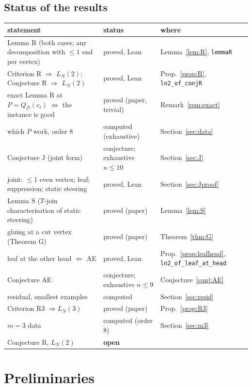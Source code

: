 \documentclass[11pt]{amsart}
\theoremstyle{definition}
\newcommand{\cD}{\mathcal D}
\begin{document}
\subsection*{Status of the results}
\begin{center}\footnotesize
\begin{tabular}{@{}p{}p{}p{}@{}}
\toprule
statement & status & where\\
\midrule
Lemma R (both cases; any decomposition with $\le1$ end per vertex) & proved, Lean & Lemma~\ref{lem:R}, \texttt{lemmaR}\\
Criterion R $\Rightarrow$ $L_N(2)$; Conjecture R $\Rightarrow$ $L_N(2)$ & proved, Lean & Prop.~\ref{prop:R}, \texttt{ln2\_of\_conjR}\\
exact Lemma R at $P=Q_\cD(c_i)$ $\Leftrightarrow$ the instance is good & proved (paper, trivial) & Remark~\ref{rem:exact}\\
which $P$ work, order $8$ & computed (exhaustive) & Section~\ref{sec:data}\\
Conjecture J (joint form) & conjecture; exhaustive $n\le10$ & Section~\ref{sec:J}\\
joint: $\le1$ even vertex; leaf; suppression; static steering & proved, Lean & Section~\ref{sec:Jproof}\\
Lemma S ($T$-join characterisation of static steering) & proved (paper) & Lemma~\ref{lem:S}\\
gluing at a cut vertex (Theorem G) & proved (paper) & Theorem~\ref{thm:G}\\
leaf at the other head $\Leftarrow$ AE & proved, Lean & Prop.~\ref{prop:leafhead}, \texttt{ln2\_of\_leaf\_at\_head}\\
Conjecture AE & conjecture; exhaustive $n\le9$ & Conjecture~\ref{conj:AE}\\
residual, smallest examples & computed & Section~\ref{sec:resid}\\
Criterion R3 $\Rightarrow L_N(3)$ & proved (paper) & Prop.~\ref{prop:R3}\\
$m=3$ data & computed (order $8$) & Section~\ref{sec:m3}\\
Conjecture R, $L_N(2)$ & \textbf{open} & \\
\bottomrule
\end{tabular}
\end{center}

\section{Preliminaries}\label{sec:prelim}
\end{document}
